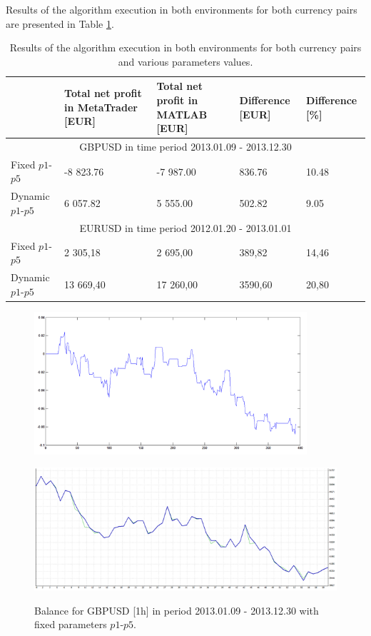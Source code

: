\documentclass[runningheads,a4paper]{llncs}
\begin{document}
Results of the algorithm execution in both environments for both currency pairs are presented in Table \ref{tab:tab5}.
\begin{table}[h!]
\centering
\caption{Results of the algorithm execution in both environments for both currency pairs and various parameters values.}
\label{tab:tab5}
\begin{tabular}{|p{}|p{}|p{}|p{}|p{}|} \hline
 &  Total net profit in MetaTrader [EUR]	 &  Total net profit in MATLAB 
[EUR]	 &  Difference [EUR]	 &  Difference [\%]\\ \hline
\multicolumn{5}{|c|}{GBPUSD in time period 2013.01.09 - 2013.12.30}\\ \hline
Fixed $p1$-$p5$	 & -8 823.76 & 	-7 987.00 & 	836.76 & 	10.48\\
Dynamic $p1$-$p5$	 & 6 057.82	 & 5 555.00	 & 502.82 & 	9.05\\ \hline
\multicolumn{5}{|c|}{EURUSD in time period 2012.01.20 - 2013.01.01}\\ \hline
Fixed $p1$-$p5$	 & 2 305,18 & 	2 695,00	 & 389,82	 & 14,46\\
Dynamic $p1$-$p5$ & 	13 669,40 & 	17 260,00 & 	3590,60	 & 20,80\\ \hline
\end{tabular}
\end{table}
\FloatBarrier
\begin{figure}[h!]
\begin{minipage}{0.49\textwidth}
\centering
\includegraphics[width = 0.9\textwidth]{figures/rys12.png}
\label{fig:fig12}
\end{minipage}
\begin{minipage}{0.49\textwidth}
\centering
\includegraphics[width = \textwidth]{figures/rys13.png}
\label{fig:fig13}
\end{minipage}
\caption{Balance for GBPUSD [1h] in period 2013.01.09 - 2013.12.30 with fixed parameters $p1$-$p5$.}
\end{figure}
\end{document}
